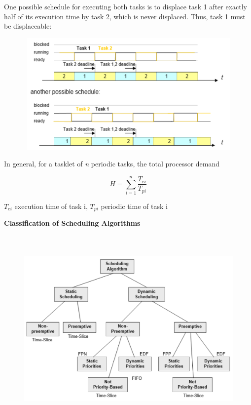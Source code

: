One possible schedule for executing both tasks is to displace task 1 after exactly half of its execution time by task 2, which is never displaced. Thus, task 1 must be displaceable:

	\begin{figure}[h]
    \centering
    \includegraphics[width=12cm, height=6cm]{Images/image86.png}
    \label{fig:Fig 32}
    \end{figure} 
\os{\newpage}
In general, for a tasklet of \textit{n} periodic tasks, the total processor demand

\begin{equation}
	H=\sum _{i=1}^{n}\frac{T_{ei} }{T_{pi}}
\label{EQ 3}
\end{equation}

$T_{ei}$ execution time of task i, $T_{pi}$ periodic time of task i\\
\newpage

{\rot\bf Classification of Scheduling Algorithms}

	\begin{figure}[h]
    \centering
    \includegraphics[width=15cm, height=10cm]{Images/image88.png}
    \label{fig:Fig 33}
    \end{figure}
\os{\newpage}

